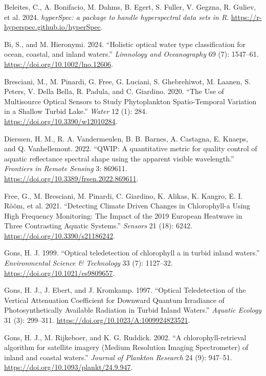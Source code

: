 \documentclass[
]{article}
\newlength{\cslhangindent}
\newenvironment{CSLReferences}[2] %
 {\begin{list}{}{%
  \setlength{\itemindent}{0pt}
  \setlength{\leftmargin}{0pt}
  \setlength{\parsep}{0pt}
  \ifodd #1
   \setlength{\leftmargin}{\cslhangindent}
   \setlength{\itemindent}{-1\cslhangindent}
  \fi
  \setlength{\itemsep}{#2\baselineskip}}}
 {\end{list}}
\begin{document}
\protect{}\label{refs}
\begin{CSLReferences}{1}{0}
Beleites, C., A. Bonifacio, M. Dahms, B. Egert, S. Fuller, V. Gegzna, R.
Guliev, et al. 2024. \emph{{hyperSpec: a package to handle hyperspectral
data sets in R}}. \url{https://r-hyperspec.github.io/hyperSpec}.

Bi, S., and M. Hieronymi. 2024. {``{Holistic optical water type
classification for ocean, coastal, and inland waters}.''}
\emph{Limnology and Oceanography} 69 (7): 1547--61.
\url{https://doi.org/10.1002/lno.12606}.

Bresciani, M., M. Pinardi, G. Free, G. Luciani, S. Ghebrehiwot, M.
Laanen, S. Peters, V. Della Bella, R. Padula, and C. Giardino. 2020.
{``{The Use of Multisource Optical Sensors to Study Phytoplankton
Spatio-Temporal Variation in a Shallow Turbid Lake}.''} \emph{Water} 12
(1): 284. \url{https://doi.org/10.3390/w12010284}.

Dierssen, H. M., R. A. Vandermeulen, B. B. Barnes, A. Castagna, E.
Knaeps, and Q. Vanhellemont. 2022. {``{QWIP: A quantitative metric for
quality control of aquatic reflectance spectral shape using the apparent
visible wavelength}.''} \emph{Frontiers in Remote Sensing} 3: 869611.
\url{https://doi.org/10.3389/frsen.2022.869611}.

Free, G., M. Bresciani, M. Pinardi, C. Giardino, K. Alikas, K. Kangro,
E. I. Rõõm, et al. 2021. {``{Detecting Climate Driven Changes in
Chlorophyll-a Using High Frequency Monitoring: The Impact of the 2019
European Heatwave in Three Contrasting Aquatic Systems}.''}
\emph{Sensors} 21 (18): 6242. \url{https://doi.org/10.3390/s21186242}.

Gons, H. J. 1999. {``{Optical teledetection of chlorophyll a in turbid
inland waters}.''} \emph{Environmental Science \& Technology} 33 (7):
1127--32. \url{https://doi.org/10.1021/es9809657}.

Gons, H. J., J. Ebert, and J. Kromkamp. 1997. {``Optical Teledetection
of the Vertical Attenuation Coefficient for Downward Quantum Irradiance
of Photosynthetically Available Radiation in Turbid Inland Waters.''}
\emph{Aquatic Ecology} 31 (3): 299--311.
\url{https://doi.org/10.1023/A:1009924823521}.

Gons, H. J., M. Rijkeboer, and K. G. Ruddick. 2002. {``{A
chlorophyll-retrieval algorithm for satellite imagery (Medium Resolution
Imaging Spectrometer) of inland and coastal waters}.''} \emph{Journal of
Plankton Research} 24 (9): 947--51.
\url{https://doi.org/10.1093/plankt/24.9.947}.


\end{CSLReferences}
\end{document}
